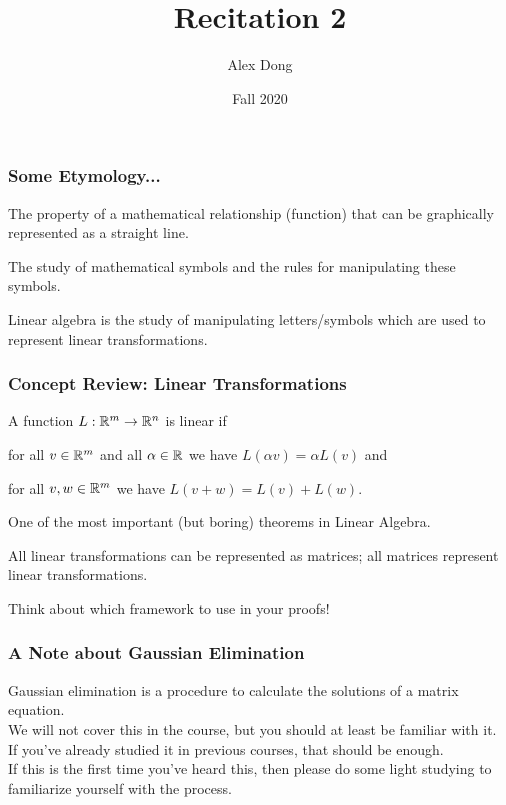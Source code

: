 \documentclass[table]{beamer}
\title{Recitation 2}
\author{Alex Dong}
\institute{CDS, NYU}
\date{Fall 2020}
\newcommand\Fonteight{\fontsize{8}{9.6}\selectfont}
\renewenvironment{enumerate}%
{\begin{list}{\arabic{enumi}.}%
      {\setlength{\leftmargin}{2.5em}%
       \setlength{\itemsep}{-\parsep}%
       \setlength{\topsep}{-\parskip}%
       \usecounter{enumi}}%
 }{\end{list}}
\begin{document}

\frame{\titlepage} 


\begin{frame}
\frametitle{Some Etymology...}

\begin{definition}
The property of a mathematical relationship (function) that can be graphically represented as a straight line.
\end{definition}

\begin{definition}
The study of mathematical symbols and the rules for manipulating these symbols.
\end{definition}
Linear algebra is the study of manipulating letters/symbols which are used to represent linear transformations.
\end{frame}


\begin{frame}
\frametitle{Concept Review: Linear Transformations}

\begin{definition}	        
		A function $L: \mathbb{R}^m \to \mathbb{R}^n$ is linear if
		\Fonteight
		
	\begin{enumerate}
		\item for all $v \in \mathbb{R}^m$ and all $\alpha \in \mathbb{R}$ we have $L(\alpha v) = \alpha L(v)$ and
		\item for all $v,w \in \mathbb{R}^m$ we have $L(v + w) = L(v) + L(w)$.
	\end{enumerate}
\end{definition}

One of the most important (but boring) theorems in Linear Algebra.

\begin{theorem}
All linear transformations can be represented as matrices; all matrices represent linear transformations.
\end{theorem}
Think about which framework to use in your proofs!
\end{frame}


\begin{frame}
\frametitle{A Note about Gaussian Elimination}

Gaussian elimination is a procedure to calculate the solutions of a matrix equation.\\
We will not cover this in the course, but you should at least be familiar with it.\\
If you've already studied it in previous courses, that should be enough.\\
If this is the first time you've heard this, then please do some light studying to familiarize yourself with the process.\\

\end{frame}
\end{document}
